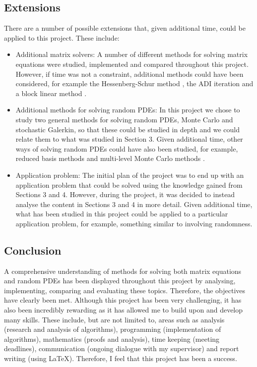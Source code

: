 \documentclass[11pt]{article}
\numberwithin{equation}{section}
\begin{document}
\subsection{Extensions}
There are a number of possible extensions that, given additional time, could be applied to this project. These include:
\begin{itemize}
\item Additional matrix solvers: A number of different methods for solving matrix equations were studied, implemented and compared throughout this project. However, if time was not a constraint, additional methods could have been considered, for example the Hessenberg-Schur method \cite{Hessenberg}, the ADI iteration \cite{Simoncini} and a block linear method \cite{Monsalve}.
\item Additional methods for solving random PDEs: In this project we chose to study two general methods for solving random PDEs, Monte Carlo and stochastic Galerkin, so that these could be studied in depth and we could relate them to what was studied in Section 3. Given additional time, other ways of solving random PDEs could have also been studied, for example, reduced basis methods \cite{Powell} and multi-level Monte Carlo methods \cite{Barth}.
\item Application problem: The initial plan of the project was to end up with an application problem that could be solved using the knowledge gained from Sections 3 and 4. However, during the project, it was decided to instead analyse the content in Sections 3 and 4 in more detail. Given additional time, what has been studied in this project could be applied to a particular application problem, for example, something similar to \cite{Barreira} involving randomness.
\end{itemize}

\subsection{Conclusion}
A comprehensive understanding of methods for solving both matrix equations and random PDEs has been displayed throughout this project by analysing, implementing, comparing and evaluating these topics. Therefore, the objectives have clearly been met. Although this project has been very challenging, it has also been incredibly rewarding as it has allowed me to build upon and develop many skills. These include, but are not limited to, areas such as analysis (research and analysis of algorithms), programming (implementation of algorithms), mathematics (proofs and analysis), time keeping (meeting deadlines), communication (ongoing dialogue with my supervisor) and report writing (using \LaTeX). Therefore, I feel that this project has been a success.

\newpage



\end{document}
